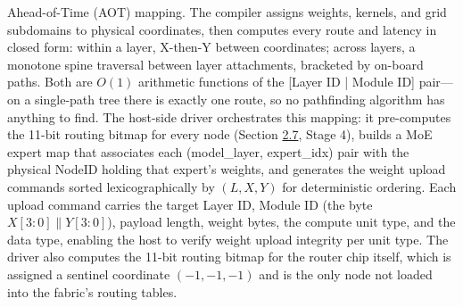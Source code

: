 \documentclass[10pt,twocolumn]{article}
\begin{document}
Ahead-of-Time (AOT) mapping. The compiler assigns weights, kernels, and grid subdomains to physical coordinates, then computes every route and latency in closed form: within a layer, X-then-Y between coordinates; across layers, a monotone spine traversal between layer attachments, bracketed by on-board paths. Both are $O(1)$ arithmetic functions of the [Layer ID | Module ID] pair---on a single-path tree there is exactly one route, so no pathfinding algorithm has anything to find. The host-side driver orchestrates this mapping: it pre-computes the 11-bit routing bitmap for every node (Section \hyperref[sec:2.7]{2.7}, Stage 4), builds a MoE expert map that associates each (model\_layer, expert\_idx) pair with the physical NodeID holding that expert's weights, and generates the weight upload commands sorted lexicographically by $(L, X, Y)$ for deterministic ordering. Each upload command carries the target Layer ID, Module ID (the byte $X[3:0] \parallel Y[3:0]$), payload length, weight bytes, the compute unit type, and the data type, enabling the host to verify weight upload integrity per unit type. The driver also computes the 11-bit routing bitmap for the router chip itself, which is assigned a sentinel coordinate $(-1, -1, -1)$ and is the only node not loaded into the fabric's routing tables.
\end{document}
